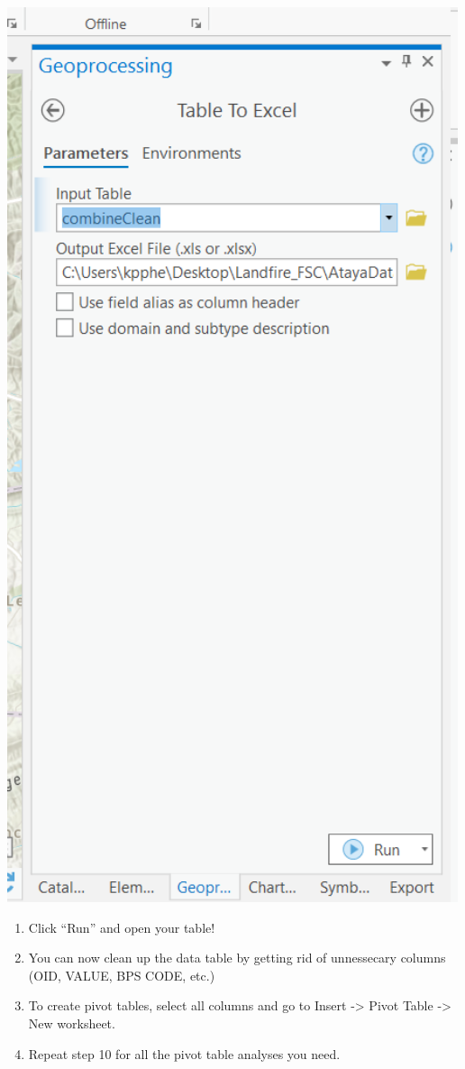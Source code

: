 \documentclass[
]{book}
\providecommand{\tightlist}{%
  \setlength{\itemsep}{0pt}\setlength{\parskip}{0pt}}
\begin{document}
\includegraphics[width=500px]{04_gis_screenshots/20_Table_Excel}

\begin{enumerate}
\def\labelenumi{\arabic{enumi}.}
\setcounter{enumi}{7}
\tightlist
\item
  Click ``Run'' and open your table!
\item
  You can now clean up the data table by getting rid of unnessecary columns (OID, VALUE, BPS CODE, etc.)
\item
  To create pivot tables, select all columns and go to Insert -\textgreater{} Pivot Table -\textgreater{} New worksheet.
\item
  Repeat step 10 for all the pivot table analyses you need.
\end{enumerate}

  
\end{document}
